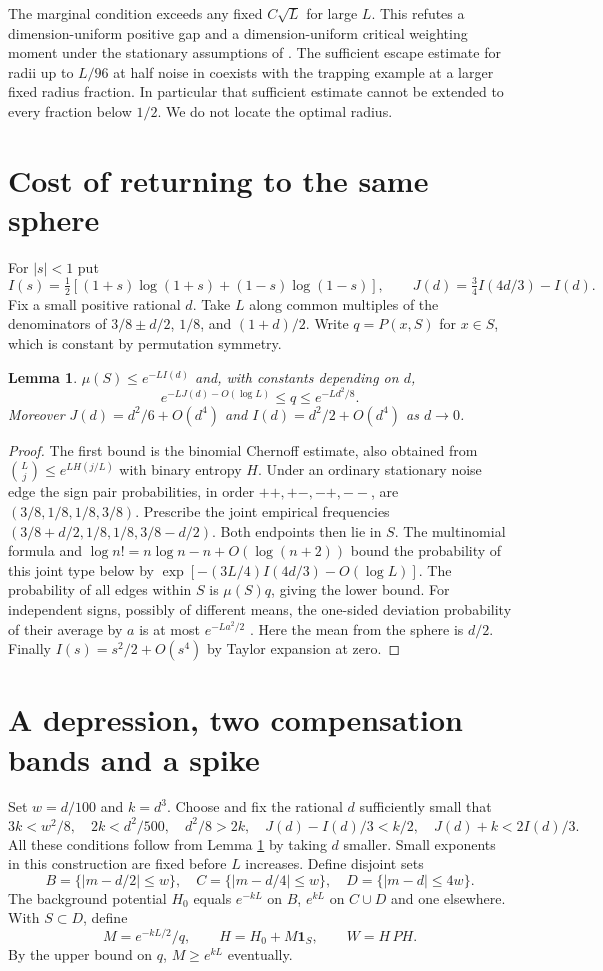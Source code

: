 \documentclass[11pt]{article}
\newtheorem{lemma}[theorem]{Lemma}
\newcommand{\one}{\mathbf 1}
\begin{document}
The marginal condition exceeds any fixed $C\sqrt L$ for large $L$. This refutes a dimension-uniform positive gap and a dimension-uniform critical weighting moment under the stationary assumptions of \cite{mom}. The sufficient escape estimate for radii up to $L/96$ at half noise in \cite{local} coexists with the trapping example at a larger fixed radius fraction. In particular that sufficient estimate cannot be extended to every fraction below $1/2$. We do not locate the optimal radius.

\section{Cost of returning to the same sphere}
For $|s|<1$ put
\[
 I(s)=\tfrac12[(1+s)\log(1+s)+(1-s)\log(1-s)],
 \qquad J(d)=\tfrac34 I(4d/3)-I(d).
\]
Fix a small positive rational $d$. Take $L$ along common multiples of the denominators of $3/8\pm d/2$, $1/8$, and $(1+d)/2$. Write $q=P(x,S)$ for $x\in S$, which is constant by permutation symmetry.
\begin{lemma}\label{type}
$\mu(S)\le e^{-LI(d)}$ and, with constants depending on $d$,
\[
 e^{-LJ(d)-O(\log L)}\le q\le e^{-Ld^2/8}.
\]
Moreover $J(d)=d^2/6+O(d^4)$ and $I(d)=d^2/2+O(d^4)$ as $d\to0$.
\end{lemma}
\begin{proof}
The first bound is the binomial Chernoff estimate, also obtained from $\binom{L}{j}\le e^{LH(j/L)}$ with binary entropy $H$. Under an ordinary stationary noise edge the sign pair probabilities, in order $++, +-, -+, --$, are $(3/8,1/8,1/8,3/8)$. Prescribe the joint empirical frequencies $(3/8+d/2,1/8,1/8,3/8-d/2)$. Both endpoints then lie in $S$. The multinomial formula and $\log n!=n\log n-n+O(\log(n+2))$ bound the probability of this joint type below by $\exp[-(3L/4)I(4d/3)-O(\log L)]$. The probability of all edges within $S$ is $\mu(S)q$, giving the lower bound. For independent signs, possibly of different means, the one-sided deviation probability of their average by $a$ is at most $e^{-La^2/2}$ \cite{hoeff}. Here the mean from the sphere is $d/2$. Finally $I(s)=s^2/2+O(s^4)$ by Taylor expansion at zero.
\end{proof}

\section{A depression, two compensation bands and a spike}
Set $w=d/100$ and $k=d^3$. Choose and fix the rational $d$ sufficiently small that
\[
 3k<w^2/8,\quad 2k<d^2/500,\quad d^2/8>2k,\quad
 J(d)-I(d)/3<k/2,\quad J(d)+k<2I(d)/3 .
\]
All these conditions follow from Lemma \ref{type} by taking $d$ smaller. Small exponents in this construction are fixed before $L$ increases. Define disjoint sets
\[
 B=\{|m-d/2|\le w\},\quad C=\{|m-d/4|\le w\},
 \quad D=\{|m-d|\le4w\}.
\]
The background potential $H_0$ equals $e^{-kL}$ on $B$, $e^{kL}$ on $C\cup D$ and one elsewhere. With $S\subset D$, define
\[
 M=e^{-kL/2}/q,\qquad H=H_0+M\one_S,\qquad W=H\,PH.
\]
By the upper bound on $q$, $M\ge e^{kL}$ eventually.
\end{document}
